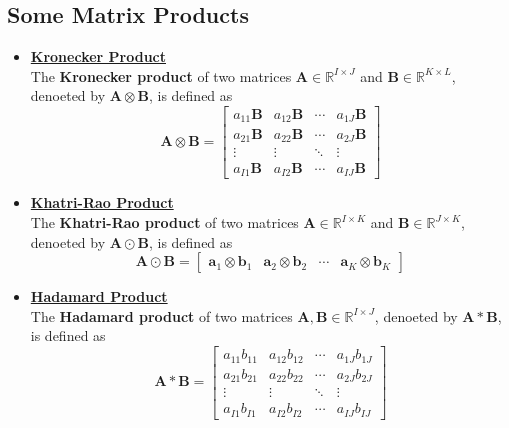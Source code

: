 \documentclass[preprint]{elsarticle}
\begin{document}
\subsection{Some Matrix Products}
\begin{itemize}
    \item \underline{\textbf{Kronecker Product}}\\[0.3cm]
    The \textbf{Kronecker product} of two matrices $\mathbf{A}\in\mathbb{R}^{I\times J}$ and $\mathbf{B}\in\mathbb{R}^{K\times L}$,
    denoeted by $\mathbf{A}\otimes\mathbf{B}$, is defined as
    \begin{equation}
        \mathbf{A}\otimes\mathbf{B}=\begin{bmatrix}
            a_{11}\mathbf{B} & a_{12}\mathbf{B} & \cdots & a_{1J}\mathbf{B} \\
            a_{21}\mathbf{B} & a_{22}\mathbf{B} & \cdots & a_{2J}\mathbf{B} \\
            \vdots & \vdots & \ddots & \vdots \\
            a_{I1}\mathbf{B} & a_{I2}\mathbf{B} & \cdots & a_{IJ}\mathbf{B}
        \end{bmatrix}
    \end{equation}
    \item \underline{\textbf{Khatri-Rao Product}}\\[0.3cm]
    The \textbf{Khatri-Rao product} of two matrices $\mathbf{A}\in\mathbb{R}^{I\times K}$ and $\mathbf{B}\in\mathbb{R}^{J\times K}$,
    denoeted by $\mathbf{A}\odot\mathbf{B}$, is defined as
    \begin{equation}
        \mathbf{A}\odot\mathbf{B}=\begin{bmatrix}
            \mathbf{a}_{1}\otimes\mathbf{b}_1 & \mathbf{a}_{2}\otimes\mathbf{b}_2 & \cdots & \mathbf{a}_{K}\otimes\mathbf{b}_K
        \end{bmatrix}
    \end{equation}
    \item \underline{\textbf{Hadamard Product}}\\[0.3cm]
    The \textbf{Hadamard product} of two matrices $\mathbf{A}, \mathbf{B}\in\mathbb{R}^{I\times J}$,
    denoeted by $\mathbf{A}*\mathbf{B}$, is defined as
    \begin{equation}
        \mathbf{A}*\mathbf{B}=\begin{bmatrix}
            a_{11}b_{11} & a_{12}b_{12} & \cdots & a_{1J}b_{1J} \\
            a_{21}b_{21} & a_{22}b_{22} & \cdots & a_{2J}b_{2J} \\
            \vdots & \vdots & \ddots & \vdots \\
            a_{I1}b_{I1} & a_{I2}b_{I2} & \cdots & a_{IJ}b_{IJ}
        \end{bmatrix}
    \end{equation}
\end{itemize}
\end{document}
